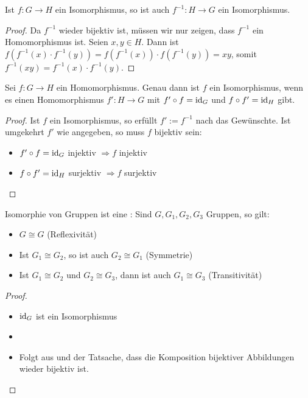 \begin{lemma}
	Ist $f:G\to H$ ein Isomorphismus, so ist auch $f^{-1}:H\to G$ ein Isomorphismus.
\end{lemma}
\begin{proof}
	Da $f^{-1}$ wieder bijektiv ist, müssen wir nur zeigen, dass $f^{-1}$ ein Homomorphismus ist. Seien $x,y\in H$. Dann 
	ist $f(f^{-1}(x)\cdot f^{-1}(y))=f(f^{-1}(x))\cdot f(f^{-1}(y))=xy$, somit $f^{-1}(xy)=f^{-1}(x)\cdot f^{-1}(y)$.
\end{proof}

\begin{proposition}
	Sei $f:G\to H$ ein Homomorphismus. Genau dann ist $f$ ein Isomorphismus, wenn es einen Homomorphismus 
	$f':H\to G$ mit $f'\circ f=\operatorname{id}_G$ und $f\circ f'=\operatorname{id}_H$ gibt.
\end{proposition}
\begin{proof}
	Ist $f$ ein Isomorphismus, so erfüllt $f':=f^{-1}$ nach  das Gewünschte. Ist umgekehrt $f'$ wie angegeben, so muss $f$ 
	bijektiv sein:
	\begin{itemize}
		\item $f'\circ f=\operatorname{id}_G$ injektiv $\Rightarrow f$ injektiv
		\item $f\circ f'=\operatorname{id}_H$ surjektiv $\Rightarrow f$ surjektiv
	\end{itemize}
\end{proof}

\begin{conclusion}
	Isomorphie von Gruppen ist eine : Sind $G,G_1,G_2,G_3$ Gruppen, so gilt:
	\begin{itemize}
		\item $G\cong G$ (Reflexivität)
		\item Ist $G_1\cong G_2$, so ist auch $G_2\cong G_1$ (Symmetrie)
		\item Ist $G_1\cong G_2$ und $G_2\cong G_3$, dann ist auch $G_1\cong G_3$ (Transitivität)
	\end{itemize}
\end{conclusion}
\begin{proof}
	\begin{itemize}
		\item $\operatorname{id}_G$ ist ein Isomorphismus
		\item {}
		\item Folgt aus  und der Tatsache, dass die Komposition bijektiver Abbildungen wieder bijektiv ist.
	\end{itemize}
\end{proof}


